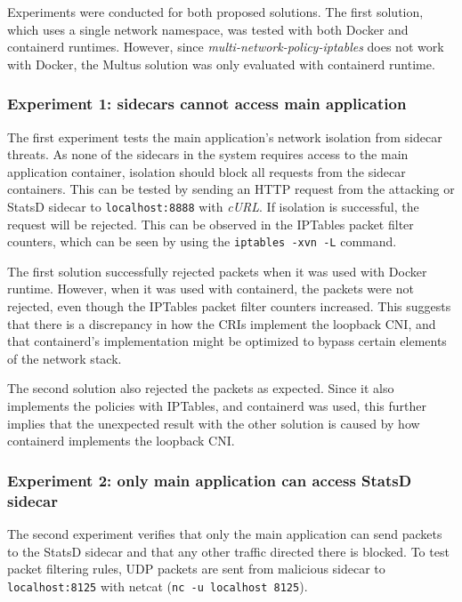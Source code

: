 \documentclass[english, 12pt, a4paper, sci, utf8, a-2b, online]{aaltothesis}
\begin{document}
Experiments were conducted for both proposed solutions.
The first solution, which uses a single network namespace, was tested with both Docker and containerd runtimes.
However, since \emph{multi-network-policy-iptables} does not work with Docker, the Multus solution was only evaluated with containerd runtime.

\subsubsection{Experiment 1: sidecars cannot access main application}

The first experiment tests the main application's network isolation from sidecar threats.
As none of the sidecars in the system requires access to the main application container, isolation should block all requests from the sidecar containers.
This can be tested by sending an HTTP request from the attacking or StatsD sidecar to \lstinline{localhost:8888} with \emph{cURL}.
If isolation is successful, the request will be rejected.
This can be observed in the IPTables packet filter counters, which can be seen by using the \lstinline{iptables -xvn -L} command.

The first solution successfully rejected packets when it was used with Docker runtime.
However, when it was used with containerd, the packets were not rejected, even though the IPTables packet filter counters increased.
This suggests that there is a discrepancy in how the CRIs implement the loopback CNI, and that containerd's implementation might be optimized to bypass certain elements of the network stack.

The second solution also rejected the packets as expected.
Since it also implements the policies with IPTables, and containerd was used, this further implies that the unexpected result with the other solution is caused by how containerd implements the loopback CNI.

\subsubsection{Experiment 2: only main application can access StatsD sidecar}

The second experiment verifies that only the main application can send packets to the StatsD sidecar and that any other traffic directed there is blocked.
To test packet filtering rules, UDP packets are sent from malicious sidecar to \lstinline{localhost:8125} with netcat (\lstinline{nc -u localhost 8125}).
\end{document}
